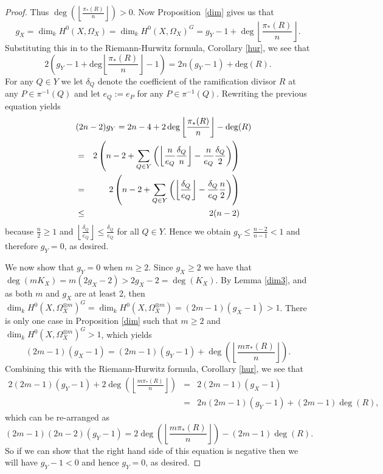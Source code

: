 \documentclass[draft, 11pt]{article} %
\theoremstyle{plain}
\theoremstyle{remark}
\begin{document}
\begin{proof}
    Thus $\deg\left( \left\lfloor \frac{\pi_*(R)}{n} \right\rfloor \right) >0$. 
    Now Proposition~\ref{dim} gives us that
      \begin{equation*}
	g_X=\dim_k H^0(X,\Omega_X)=\dim_k H^0(X,\Omega_X)^G= g_Y-1+\deg\left\lfloor \frac{\pi_*(R)}{n} \right\rfloor.
      \end{equation*}
    Substituting this in to the Riemann-Hurwitz formula, Corollary \ref{hur}, we see that
      \begin{equation*}
	2\left(g_Y - 1 + \textrm{deg}\left \lfloor \frac{\pi_*(R)}{n} \right \rfloor -1 \right) = 2n (g_Y -1) + \textrm{deg}(R).
      \end{equation*}
    For any $Q \in Y$ we let $\delta_Q$ denote the coefficient of the ramification divisor $R$ at any $P \in \pi^{-1}(Q)$ and let $e_Q := e_P$ for any $P \in \pi^{-1}(Q)$. 
    Rewriting the previous equation yields
      \begin{eqnarray*}
	\lefteqn{(2n-2)g_Y = 2n-4 + 2 \,\textrm{deg}\left \lfloor \frac{\pi_*(R)}{n}\right \rfloor - \textrm{deg}(R)}\\
	&=& 2 \left(n-2 + \sum_{Q \in Y} \left(\left\lfloor \frac{n}{e_Q} \frac{\delta_Q}{n} \right\rfloor - \frac{n}{e_Q} \frac{\delta_Q}{2}\right) \right)\\
	&=& 2 \left(n-2 + \sum_{Q \in Y} \left( \left\lfloor \frac{\delta_Q}{e_Q} \right\rfloor - \frac{\delta_Q}{e_Q} \frac{n}{2} \right)\right)\\
	& \le & 2(n-2)
      \end{eqnarray*}
    because $\frac{n}{2} \ge 1$ and $\left\lfloor \frac{\delta_Q}{e_Q}\right\rfloor \le \frac{\delta_Q}{e_Q}$ for all $Q \in Y$. 
    Hence we obtain $g_Y \le \frac{n-2}{n-1} < 1$ and therefore $g_Y =0$, as desired.

    We now show that $g_Y=0$ when $m\geq 2$. 
    Since $g_X\geq 2$ we have that $\deg(mK_X)=m(2g_X-2)>2g_X-2=\deg(K_X)$.
    By Lemma \ref{dim3}, and as both $m$ and $g_X$ are at least 2, then $\dim_kH^0(X,\Omega_X^{\otimes m})^G=\dim_kH^0(X,\Omega_X^{\otimes m})=(2m-1)(g_X-1)>1$.
    There is only one case in Proposition \ref{dim} such that $m\geq 2$ and $\dim_k H^0(X,\Omega_X^{\otimes m})^G>1$, which yields 
      \begin{equation*}
	(2m-1)(g_X-1)=(2m-1)(g_Y-1)+\deg\left(\left\lfloor \frac{m\pi_*(R)}{n} \right\rfloor \right).
      \end{equation*}
    Combining this with the Riemann-Hurwitz formula, Corollary \ref{hur}, we see that
      \begin{eqnarray*}
	2(2m-1)(g_Y-1)+2\deg\left(\left\lfloor\frac{m\pi_*(R)}{n}\right\rfloor\right) & = & 2(2m-1)(g_X-1)\\
	& = & 2n(2m-1)(g_Y-1)+(2m-1)\deg(R),
      \end{eqnarray*}
    which can be re-arranged as
      \begin{equation*}
	(2m-1)(2n-2)(g_Y-1)=2\deg\left(\left\lfloor\frac{m\pi_*(R)}{n}\right\rfloor\right)-(2m-1)\deg(R).
      \end{equation*}
    So if we can show that the right hand side of this equation is negative then we will have $g_Y-1<0$ and hence $g_Y=0$, as desired.


\end{proof}
\end{document}
